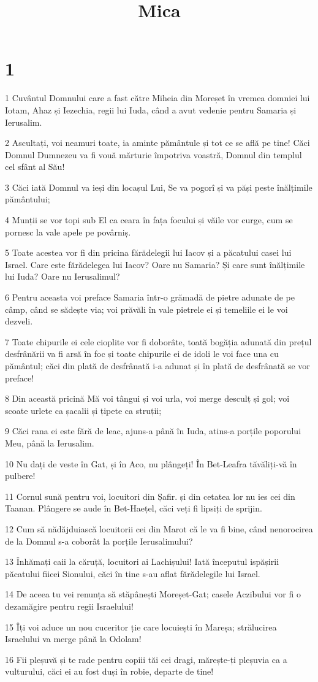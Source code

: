 

\title{Mica}


\chapter{1}

\par 1 Cuvântul Domnului care a fast către Miheia din Moreșet în vremea domniei lui Iotam, Ahaz și Iezechia, regii lui Iuda, când a avut vedenie pentru Samaria și Ierusalim.
\par 2 Ascultați, voi neamuri toate, ia aminte pământule și tot ce se află pe tine! Căci Domnul Dumnezeu va fi vouă mărturie împotriva voastră, Domnul din templul cel sfânt al Său!
\par 3 Căci iată Domnul va ieși din locașul Lui, Se va pogorî și va păși peste înălțimile pământului;
\par 4 Munții se vor topi sub El ca ceara în fața focului și văile vor curge, cum se pornesc la vale apele pe povârniș.
\par 5 Toate acestea vor fi din pricina fărădelegii lui Iacov și a păcatului casei lui Israel. Care este fărădelegea lui Iacov? Oare nu Samaria? Și care sunt înălțimile lui Iuda? Oare nu Ierusalimul?
\par 6 Pentru aceasta voi preface Samaria într-o grămadă de pietre adunate de pe câmp, când se sădește via; voi prăvăli în vale pietrele ei și temeliile ei le voi dezveli.
\par 7 Toate chipurile ei cele cioplite vor fi doborâte, toată bogăția adunată din prețul desfrânării va fi arsă în foc și toate chipurile ei de idoli le voi face una cu pământul; căci din plată de desfrânată i-a adunat și în plată de desfrânată se vor preface!
\par 8 Din această pricină Mă voi tângui și voi urla, voi merge desculț și gol; voi scoate urlete ca șacalii și țipete ca struții;
\par 9 Căci rana ei este fără de leac, ajuns-a până în Iuda, atins-a porțile poporului Meu, până la Ierusalim.
\par 10 Nu dați de veste în Gat, și în Aco, nu plângeți! În Bet-Leafra tăvăliți-vă în pulbere!
\par 11 Cornul sună pentru voi, locuitori din Șafir. și din cetatea lor nu ies cei din Taanan. Plângere se aude în Bet-Haețel, căci veți fi lipsiți de sprijin.
\par 12 Cum să nădăjduiască locuitorii cei din Marot că le va fi bine, când nenorocirea de la Domnul s-a coborât la porțile Ierusalimului?
\par 13 Înhămați caii la căruță, locuitori ai Lachișului! Iată începutul ispășirii păcatului fiicei Sionului, căci în tine s-au aflat fărădelegile lui Israel.
\par 14 De aceea tu vei renunța să stăpânești Moreșet-Gat; casele Aczibului vor fi o dezamăgire pentru regii Israelului!
\par 15 Îți voi aduce un nou cuceritor ție care locuiești în Mareșa; strălucirea Israelului va merge până la Odolam!
\par 16 Fii pleșuvă și te rade pentru copiii tăi cei dragi, mărește-ți pleșuvia ca a vulturului, căci ei au fost duși în robie, departe de tine!

